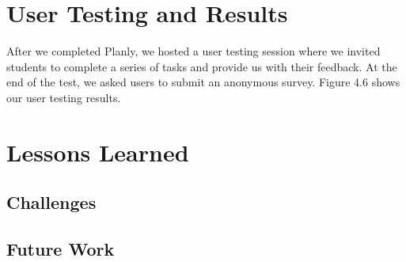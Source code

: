 \section{User Testing and Results}
After we completed Planly, we hosted a user testing session where we invited students to complete a series of tasks and provide us with their feedback. At the end of the test, we asked users to submit an anonymous survey. Figure 4.6 shows our user testing results. 
\par 
\section{Lessons Learned}
\subsection{Challenges}
\subsection{Future Work}

